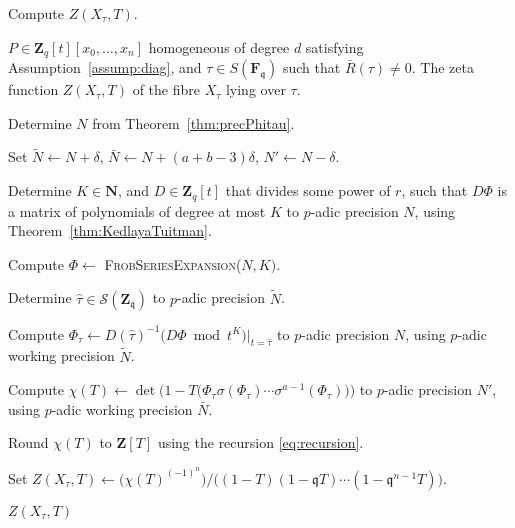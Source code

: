 \documentclass[a4paper,11pt]{article}
\numberwithin{equation}{section}
\newcommand{\NN}{\mathbf{N}} %
\newcommand{\ZZ}{\mathbf{Z}} %
\theoremstyle{definition}
\begin{document}
\begin{algorithm} 
\caption{Compute $Z(X_{\tau},T)$.}
\label{alg:complete}
\begin{algorithmic}
\vspace{1mm}
\Require $P \in \ZZ_q[t][x_0,\dotsc,x_n]$ homogeneous of degree $d$ satisfying Assumption~\ref{assump:diag}, and $\tau \in S(\mathbf{F}_{\mathfrak{q}})$ such that $\bar{R}(\tau) \neq 0$.
\Ensure  The zeta function $Z(X_{\tau},T)$ of the fibre $X_{\tau}$ lying over $\tau$.
\State \begin{compactenum}[{\hspace{1em} } 1.] \vspace{-1.24em}
\item Determine $N$ from Theorem~\ref{thm:precPhitau}.
\item Set $\tilde{N} \gets N + \delta$, $\bar{N} \gets N+(a+b-3) \delta$, $N' \gets N-\delta$.
\item Determine $K \in \NN$, and $D \in \ZZ_q[t]$ that divides some power of $r$, such that $D \Phi$ is a matrix 
      of polynomials of degree at most $K$ to $p$-adic precision $N$, using Theorem~\ref{thm:KedlayaTuitman}.
\item Compute $\Phi \gets$ \textsc{FrobSeriesExpansion($N,K)$}.
\item Determine $\hat{\tau} \in \mathcal{S}(\ZZ_{\mathfrak{q}})$ to $p$-adic precision $\tilde{N}$.
\item Compute $\Phi_{\tau} \gets D(\hat{\tau})^{-1} \bigl( D \Phi \bmod{t^{K}} \bigr)|_{t=\hat{\tau}}$ 
      to $p$-adic precision $N$, using $p$-adic working precision $\tilde{N}$.
\item Compute $\chi(T) \gets \det\bigl(1-T \bigl(\Phi_{\tau} \sigma(\Phi_{\tau}) \dotsm \sigma^{a-1}(\Phi_{\tau}) \bigr)  \bigr)$ to $p$-adic precision $N'$, 
      using $p$-adic working precision $\bar{N}$.
\item Round $\chi(T)$ to $\ZZ[T]$ using the recursion \eqref{eq:recursion}. 
\item Set $Z(X_{\tau},T) \gets \bigl( \chi(T)^{(-1)^n} \bigr)/\bigl((1 - T) (1 - \mathfrak{q}T) \dotsm (1 - \mathfrak{q}^{n-1}T)\bigr)$.
\item \Return $Z(X_{\tau},T)$
\end{compactenum}
\EndProcedure
\end{algorithmic}
\end{algorithm}

\end{document}
